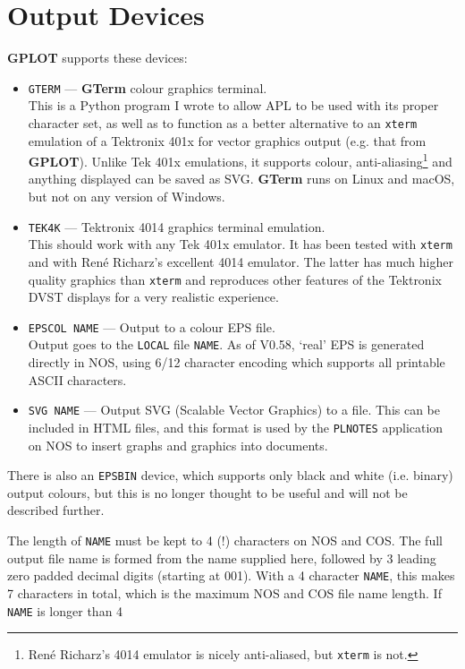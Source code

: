\documentclass[a4paper,twoside,11pt]{article}
\newcommand{\newpara}{\par\vspace{4mm}\noindent}
\newcommand{\textttc}[1]{\texttt{\textcolor{OurRed}{#1}}}
\begin{document}
\section{Output Devices}\label{devinfolabel}
\textbf{GPLOT} supports these devices:
\begin{itemize}
\item \textttc{GTERM} --- \textbf{GTerm} colour graphics terminal.\\
   This is a Python program I wrote to allow APL to be used with its proper character set, as
   well as to function as a better alternative to an \texttt{xterm} emulation of a Tektronix 401x for
   vector graphics output (e.g. that from \textbf{GPLOT}). Unlike Tek 401x emulations, it supports colour,
   anti-aliasing\footnote{Ren\'{e} Richarz's 4014 emulator is nicely anti-aliased, but \texttt{xterm} is not.} 
   and anything displayed can be saved as SVG. \textbf{GTerm} runs on Linux and macOS, but not
   on any version of Windows.
\item \textttc{TEK4K} --- Tektronix 4014 graphics terminal emulation.\\
   This should work with any Tek 401x emulator. It has been tested with \texttt{xterm} and with Ren\'{e} Richarz's
   excellent 4014 emulator. The latter has much higher quality graphics than \texttt{xterm}
   and reproduces other features of the Tektronix
   DVST displays for a very realistic experience.
\item \textttc{EPSCOL NAME} --- Output to a colour EPS file.\\
   Output goes to the \texttt{LOCAL} file \texttt{NAME}. As of V0.58,
   `real' EPS is generated directly in NOS, using 6/12 character encoding which supports all printable ASCII
   characters.
\item \textttc{SVG NAME} --- Output SVG (Scalable Vector Graphics) to a file. This can be included in HTML files, and
	this format is used by the \texttt{PLNOTES} application on NOS to insert graphs and graphics into documents. 
\end{itemize}
\newpara
There is also an \textttc{EPSBIN} device, which supports only black and white (i.e. binary) output colours, but this
is no longer thought to be useful and will not be described further.
\newpara
The length of \texttt{NAME} must be kept to 4 (!) characters on NOS and COS. The full output file name is formed from
the name supplied here, followed by 3 leading zero padded decimal digits (starting at 001). With a 4 character
\texttt{NAME}, this makes 7 characters in total, which is the maximum NOS and COS file name length. If \texttt{NAME} is longer than 4
\end{document}
